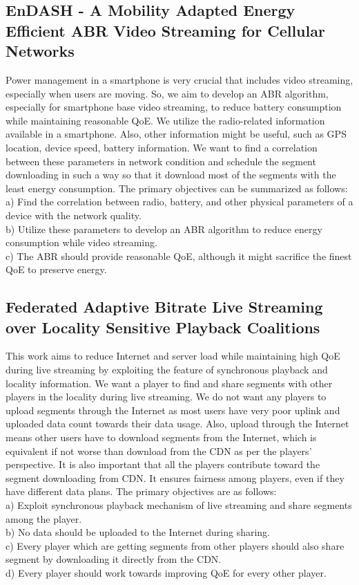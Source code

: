\subsection{EnDASH - A Mobility Adapted Energy
	Efficient ABR Video Streaming for
	Cellular Networks}
Power management in a smartphone is very crucial that includes video streaming, especially when users are moving. So, we aim to develop an ABR algorithm, especially for smartphone base video streaming, to reduce battery consumption while maintaining reasonable QoE. We utilize the radio-related information available in a smartphone. Also, other information might be useful, such as GPS location, device speed, battery information. We want to find a correlation between these parameters in network condition and schedule the segment downloading in such a way so that it download most of the segments with the least energy consumption. The primary objectives can be summarized as follows:\\
a) Find the correlation between radio, battery, and other physical parameters of a device with the network quality.\\
b) Utilize these parameters to develop an ABR algorithm to reduce energy consumption while video streaming.\\
c) The ABR should provide reasonable QoE, although it might sacrifice the finest QoE to preserve energy.

\subsection{Federated Adaptive Bitrate Live
	Streaming over Locality Sensitive
	Playback Coalitions}
This work aims to reduce Internet and server load while maintaining high QoE during live streaming by exploiting the feature of synchronous playback and locality information. We want a player to find and share segments with other players in the locality during live streaming. We do not want any players to upload segments through the Internet as most users have very poor uplink and uploaded data count towards their data usage. Also, upload through the Internet means other users have to download segments from the Internet, which is equivalent if not worse than download from the CDN as per the players' perspective. It is also important that all the players contribute toward the segment downloading from CDN. It ensures fairness among players, even if they have different data plans. The primary objectives are as follows: \\
a) Exploit synchronous playback mechanism of live streaming and share segments among the player.\\
b) No data should be uploaded to the Internet during sharing.\\
c) Every player which are getting segments from other players should also share segment by downloading it directly from the CDN. \\
d) Every player should work towards improving QoE for every other player.